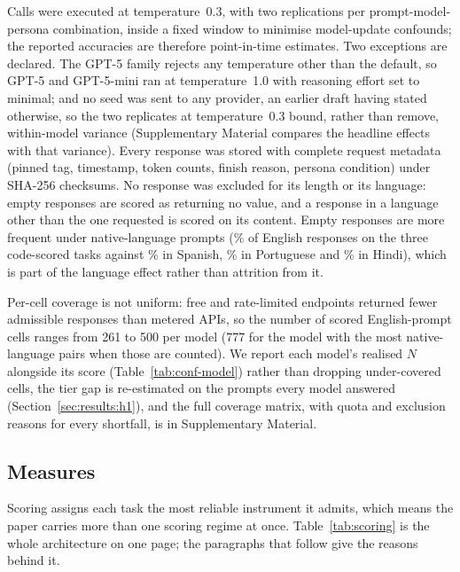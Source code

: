 Calls were executed at temperature~0.3, with two replications per
prompt-model-persona combination, inside a fixed window to minimise model-update
confounds; the reported accuracies are therefore point-in-time estimates. Two
exceptions are declared. The GPT-5 family rejects any temperature other than the
default, so GPT-5 and GPT-5-mini ran at temperature~1.0 with reasoning effort
set to minimal; and no seed was sent to any provider, an earlier draft having
stated otherwise, so the two replicates at temperature~0.3 bound, rather than
remove, within-model variance (Supplementary Material compares the headline
effects with that variance). Every response was stored with complete request
metadata (pinned tag, timestamp, token counts, finish reason, persona condition)
under SHA-256 checksums. No response was excluded for its length or its
language: empty responses are scored as returning no value, and a response in a
language other than the one requested is scored on its content. Empty responses
are more frequent under native-language prompts (\nemptyen\% of English
responses on the three code-scored tasks against \nemptyes\% in Spanish,
\nemptypt\% in Portuguese and \nemptyhi\% in Hindi), which is part of the
language effect rather than attrition from it.

Per-cell coverage is not uniform: free and rate-limited endpoints returned
fewer admissible responses than metered APIs, so the number of scored
English-prompt cells ranges from 261 to 500 per model (777 for the model with
the most native-language pairs when those are counted). We report each model's
realised $N$ alongside its score (Table~\ref{tab:conf-model}) rather than
dropping under-covered cells, the tier gap is re-estimated on the prompts every
model answered (Section~\ref{sec:results:h1}), and the full coverage matrix,
with quota and exclusion reasons for every shortfall, is in Supplementary
Material.

\subsection{Measures}

Scoring assigns each task the most reliable instrument it admits, which means
the paper carries more than one scoring regime at once.
Table~\ref{tab:scoring} is the whole architecture on one page; the paragraphs
that follow give the reasons behind it.

